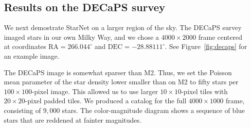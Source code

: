 \subsection{Results on the DECaPS survey}
\label{sec:results_on_decam}

We next demostrate StarNet on a larger region of the sky.
The DECaPS survey imaged stars in our own Milky Way, and we chose
a $4000 \times 2000$ frame centered at coordinates $\text{RA} = 266.044^\circ$ and
$\text{DEC} = -28.88111^\circ$. See Figure~\ref{fig:decaps} for an example image.

The DECaPS image is somewhat sparser than M2.
Thus, we set the Poisson mean parameter of the star density lower smaller than on M2 to fifty stars per $100 \times 100$-pixel image.
This allowed us to use larger $10\times 10$-pixel tiles with $20\times20$-pixel
padded tiles. 
We produced
a catalog for the full $4000 \times 1000$ frame, consisting of $9,000$ stars. 
The color-magnitude diagram shows a sequence of blue
stars that are reddened at fainter magnitudes. 

